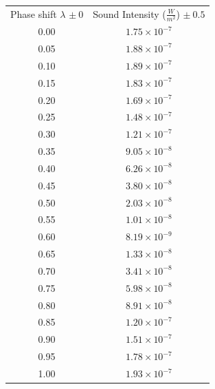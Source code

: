 \documentclass[index]{subfiles}
\begin{document}
\begin{table}[H]
    \centering
    \begin{tabular}{@{}cc@{}}
        Phase shift \(\lambda\) \(\pm\ 0\) & Sound Intensity (\(\frac{W}{m^2}\)) \(\pm\ 0.5\) \\
        0.00                               & \(1.75\times 10^{-7}\)                           \\
        0.05                               & \(1.88\times 10^{-7}\)                           \\
        0.10                               & \(1.89\times 10^{-7}\)                           \\
        0.15                               & \(1.83\times 10^{-7}\)                           \\
        0.20                               & \(1.69\times 10^{-7}\)                           \\
        0.25                               & \(1.48\times 10^{-7}\)                           \\
        0.30                               & \(1.21\times 10^{-7}\)                           \\
        0.35                               & \(9.05\times 10^{-8}\)                           \\
        0.40                               & \(6.26\times 10^{-8}\)                           \\
        0.45                               & \(3.80\times 10^{-8}\)                           \\
        0.50                               & \(2.03\times 10^{-8}\)                           \\
        0.55                               & \(1.01\times 10^{-8}\)                           \\
        0.60                               & \(8.19\times 10^{-9}\)                           \\
        0.65                               & \(1.33\times 10^{-8}\)                           \\
        0.70                               & \(3.41\times 10^{-8}\)                           \\
        0.75                               & \(5.98\times 10^{-8}\)                           \\
        0.80                               & \(8.91\times 10^{-8}\)                           \\
        0.85                               & \(1.20\times 10^{-7}\)                           \\
        0.90                               & \(1.51\times 10^{-7}\)                           \\
        0.95                               & \(1.78\times 10^{-7}\)                           \\
        1.00                               & \(1.93\times 10^{-7}\)                           \\
    \end{tabular}
\end{table}
\end{document}
